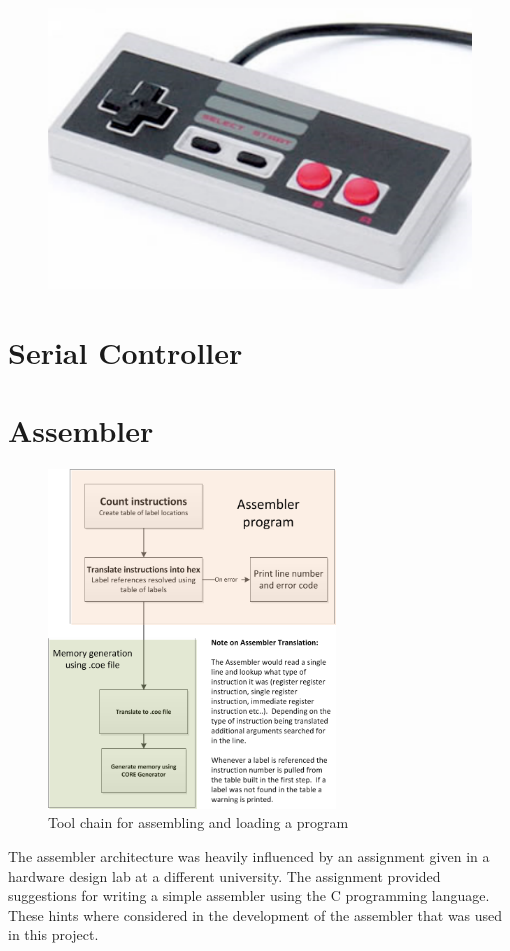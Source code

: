 \documentclass{article}
\begin{document}
\begin{figure}[h!]
	\centering
	\includegraphics[width = .5\textwidth]{nescontroller.png}
	\label{nes}
\end{figure}

\section{Serial Controller}

\section{Assembler}

\begin{figure}[h!]
	\centering
	\includegraphics[width = 3in]{assembler_diagram.png}
	\caption{Tool chain for assembling and loading a program}
	\label{fig:assembler}
\end{figure}

The assembler architecture was heavily influenced by an assignment given in a hardware design lab at a different university.  The assignment provided suggestions for writing a simple assembler using the C programming language.  These hints where considered in the development of the assembler that was used in this project.
\end{document}
